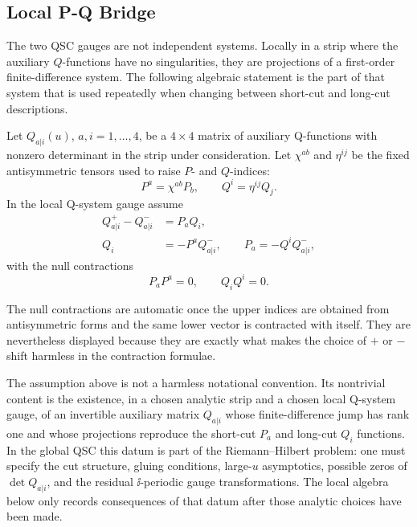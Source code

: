 \subsection{Local P-Q Bridge}

The two QSC gauges are not independent systems.  Locally in a strip where the
auxiliary \(Q\)-functions have no singularities, they are projections of a
first-order finite-difference system.  The following algebraic statement is
the part of that system that is used repeatedly when changing between
short-cut and long-cut descriptions.

\begin{assumption}
\label{ass:qsc-local-pq-bridge}
Let \(Q_{a|i}(u)\), \(a,i=1,\ldots,4\), be a \(4\times4\) matrix of auxiliary
Q-functions with nonzero determinant in the strip under consideration.  Let
\(\chi^{ab}\) and \(\eta^{ij}\) be the fixed antisymmetric tensors used to
raise \(P\)- and \(Q\)-indices:
\[
  P^a=\chi^{ab}P_b,\qquad Q^i=\eta^{ij}Q_j.
\]
In the local Q-system gauge assume
\begin{align}
  Q_{a|i}^+ - Q_{a|i}^-
  &=
  P_a Q_i,
  \label{eq:qsc-local-pq-rank-one-shift}\\
  Q_i&=-P^a Q_{a|i}^-,
  \qquad
  P_a=-Q^i Q_{a|i}^-,
  \label{eq:qsc-local-pq-contractions}
\end{align}
with the null contractions
\[
  P_aP^a=0,\qquad Q_iQ^i=0.
\]
\end{assumption}

The null contractions are automatic once the upper indices are obtained from
antisymmetric forms and the same lower vector is contracted with itself.  They
are nevertheless displayed because they are exactly what makes the choice of
\(+\) or \(-\) shift harmless in the contraction formulae.

The assumption above is not a harmless notational convention.  Its
nontrivial content is the existence, in a chosen analytic strip and a chosen
local Q-system gauge, of an invertible auxiliary matrix \(Q_{a|i}\) whose
finite-difference jump has rank one and whose projections reproduce the
short-cut \(P_a\) and long-cut \(Q_i\) functions.  In the global QSC this
datum is part of the Riemann--Hilbert problem: one must specify the cut
structure, gluing conditions, large-\(u\) asymptotics, possible zeros of
\(\det Q_{a|i}\), and the residual \(\ii\)-periodic gauge transformations.
The local algebra below only records consequences of that datum after those
analytic choices have been made.

